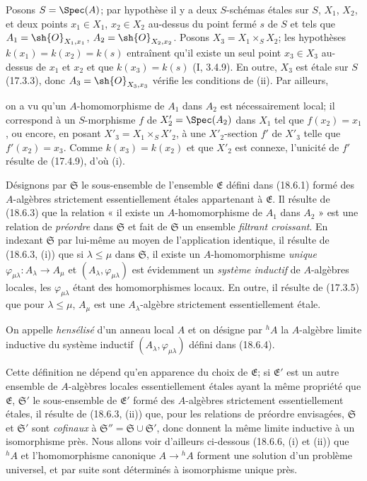 Posons $S=\Spec(A)$; par hypothèse il y a deux $S$-schémas étales sur $S$, $X_1$, $X_2$, et deux points $x_1\in X_1$, $x_2\in X_2$ au-dessus du point fermé $s$ de $S$ et tels que $A_1=\sh{O}_{X_1,x_1}$, $A_2=\sh{O}_{X_2,x_2}$. Posons $X_3=X_1\times_S X_2$; les hypothèses $k(x_1)=k(x_2)=k(s)$ entraînent qu'il existe un seul point $x_3\in X_3$ au-dessus de $x_1$ et $x_2$ et que $k(x_3)=k(s)$ (I, 3.4.9). En outre, $X_3$ est étale sur $S$ (17.3.3), donc $A_3=\sh{O}_{X_3,x_3}$ vérifie les conditions de (ii). Par ailleurs,


on a vu qu'un $A$-homomorphisme de $A_1$ dans $A_2$ est nécessairement local; il correspond à un $S$-morphisme $f$ de $X'_2=\Spec(A_2)$ dans $X_1$ tel que $f(x_2)=x_1$, ou encore, en posant $X'_3=X_1\times_S X'_2$, à une $X'_2$-section $f'$ de $X'_3$ telle que $f'(x_2)=x_3$. Comme $k(x_3)=k(x_2)$ et que $X'_2$ est connexe, l'unicité de $f'$ résulte de (17.4.9), d'où (i).

\begin{env}[18.6.4]
\label{IV.18.6.4}
Désignons par $\mathfrak S$ le sous-ensemble de l'ensemble $\mathfrak E$ défini dans (18.6.1) formé des $A$-algèbres strictement essentiellement étales appartenant à $\mathfrak E$. Il résulte de (18.6.3) que la relation « il existe un $A$-homomorphisme de $A_1$ dans $A_2$ » est une relation de \emph{préordre} dans $\mathfrak S$ et fait de $\mathfrak S$ un ensemble \emph{filtrant croissant}. En indexant $\mathfrak S$ par lui-même au moyen de l'application identique, il résulte de (18.6.3, (i)) que si $\lambda\leq\mu$ dans $\mathfrak S$, il existe un $A$-homomorphisme \emph{unique} $\varphi_{\mu\lambda}:A_\lambda\to A_\mu$ et $(A_\lambda,\varphi_{\mu\lambda})$ est évidemment un \emph{système inductif} de $A$-algèbres locales, les $\varphi_{\mu\lambda}$ étant des homomorphismes locaux. En outre, il résulte de (17.3.5) que pour $\lambda\leq\mu$, $A_\mu$ est une $A_\lambda$-algèbre strictement essentiellement étale.
\end{env}

\begin{definition}[18.6.5]
On appelle \emph{hensélisé} d'un anneau local $A$ et on désigne par ${}^h\!A$ la $A$-algèbre limite inductive du système inductif $(A_\lambda,\varphi_{\mu\lambda})$ défini dans (18.6.4).
\end{definition}

Cette définition ne dépend qu'en apparence du choix de $\mathfrak E$; si $\mathfrak E'$ est un autre ensemble de $A$-algèbres locales essentiellement étales ayant la même propriété que $\mathfrak E$, $\mathfrak S'$ le sous-ensemble de $\mathfrak E'$ formé des $A$-algèbres strictement essentiellement étales, il résulte de (18.6.3, (ii)) que, pour les relations de préordre envisagées, $\mathfrak S$ et $\mathfrak S'$ sont \emph{cofinaux} à $\mathfrak S''=\mathfrak S\cup\mathfrak S'$, donc donnent la même limite inductive à un isomorphisme près. Nous allons voir d'ailleurs ci-dessous (18.6.6, (i) et (ii)) que ${}^h\!A$ et l'homomorphisme canonique $A\to{}^h\!A$ forment une solution d'un problème universel, et par suite sont déterminés à isomorphisme unique près.

